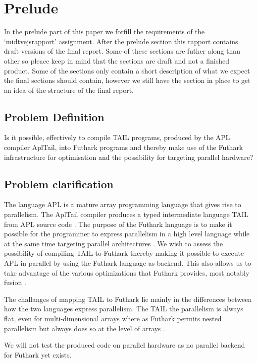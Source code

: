 \documentclass[11pt]{article}
\begin{document}
\section{Prelude}

In the prelude part of this paper we forfill the requirements of the `midtvejsrapport' assignment.
After the prelude section this rapport contains draft versions of the final report. Some of these sections are futher
along than other so pleace keep in mind that the sections are draft and not a finished product.
Some of the sections only contain a short description of what we expect the final sections should contain, however we still have
the section in place to get an idea of the structure of the final report.  

\subsection{Problem Definition}
Is it possible, effectively to compile TAIL programs, produced by the APL compiler AplTail,
into Futhark programs and thereby make use of the Futhark infrastructure for optimisation
and the possibility for targeting parallel hardware?

\subsection{Problem clarification}
The language APL is a mature array programming language that gives rise to parallelism.
The AplTail compiler produces a typed intermediate language TAIL from APL source code \cite{ElsmanDybdal:Array:2014}.
The purpose of the Futhark language is to make it possible for the programmer to express parallelism in a high level language
while at the same time targeting parallel architectures \cite{TroelsHenriksen}.
We wish to assess the possibility of compiling TAIL to Futhark thereby making it possible to execute APL in parallel
by using the Futhark language as backend.
This also allows us to take advantage of the various optimizations that Futhark provides, most notably fusion \cite{TroelsHenriksen}.

The challanges of mapping TAIL to Futhark lie mainly in the differences between how the two languages express parallelism.
The TAIL the parallelism is always flat, even for multi-dimensional arrays where as Futhark permits nested parallelism but always
does so at the level of arrays\cite{ElsmanDybdal:Array:2014} \cite{TroelsHenriksen}.

We will not test the produced code on parallel hardware as no parallel backend for Futhark yet exists.
\end{document}
